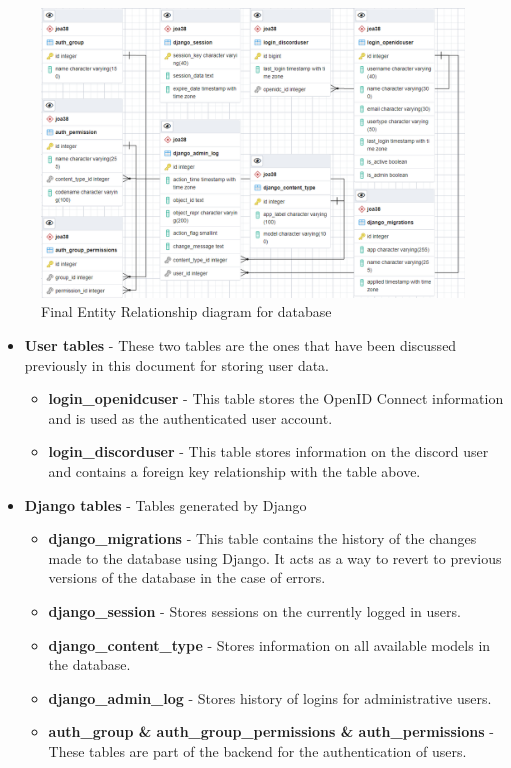 \begin{figure}[H]
	\centering
	\includegraphics[width=1\linewidth]{Figures/er-diagram.png}
	\caption{Final Entity Relationship diagram for database}
	\label{fig:final-database}
\end{figure}

\begin{itemize}
	\item \textbf{User tables} - These two tables are the ones that have been discussed previously in this document for storing user data.
	\begin{itemize}
		\item \textbf{login\_openidcuser} - This table stores the OpenID Connect \cite{OpenID} information and is used as the authenticated user account.
		\item \textbf{login\_discorduser} - This table stores information on the discord user and contains a foreign key relationship with the table above.
	\end{itemize}
	\item \textbf{Django tables} - Tables generated by Django \cite{Django}
	\begin{itemize}
		\item \textbf{django\_migrations} - This table contains the history of the changes made to the database using Django. It acts as a way to revert to previous versions of the database in the case of 
		errors.
		\item \textbf{django\_session} - Stores sessions on the currently logged in users.
		\item \textbf{django\_content\_type} - Stores information on all available models in the database.
		\item \textbf{django\_admin\_log} - Stores history of logins for administrative users.
		\item \textbf{auth\_group \& auth\_group\_permissions \& auth\_permissions} - These tables are part of the backend for the authentication of users.
	\end{itemize}
\end{itemize}

